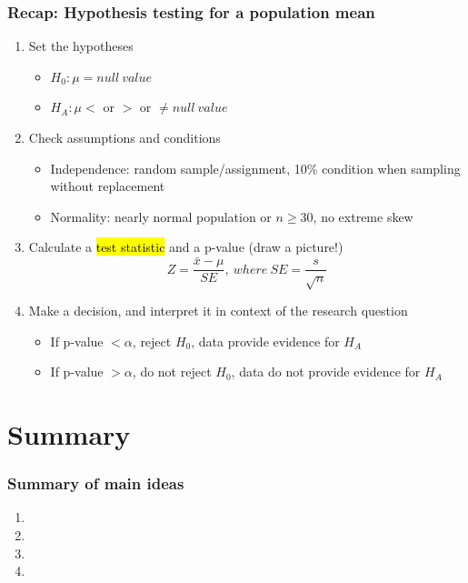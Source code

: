 \documentclass[11pt,containsverbatim,handout,xcolor=xelatex,dvipsnames,table]{beamer}
\begin{document}

\begin{frame}
\frametitle{Recap: Hypothesis testing for a population mean}

\begin{enumerate}

\item Set the hypotheses
\begin{itemize}
\item $H_0: \mu = null~value$
\item $H_A: \mu <$ or $>$ or $\ne null~value$
\end{itemize}

\item Check assumptions and conditions
\begin{itemize}
\item Independence: random sample/assignment, 10\% condition when sampling without replacement
\item Normality: nearly normal population or $n \ge 30$, no extreme skew
\end{itemize}

\item Calculate a \hl{test statistic} and a p-value (draw a picture!)
\[ Z = \frac{\bar{x} - \mu}{SE},~where~SE = \frac{s}{\sqrt{n}} \]

\item Make a decision, and interpret it in context of the research question
\begin{itemize}
\item If p-value $< \alpha$, reject $H_0$, data provide evidence for $H_A$
\item If p-value $> \alpha$, do not reject $H_0$, data do not provide evidence for $H_A$
\end{itemize}

\end{enumerate}

\end{frame}


\section{Summary}


\begin{frame}
\frametitle{Summary of main ideas}

\vfill

\begin{enumerate}

\item {}

\item {}

\item {}

\item {}

\end{enumerate}

\vfill

\end{frame}

\end{document}
